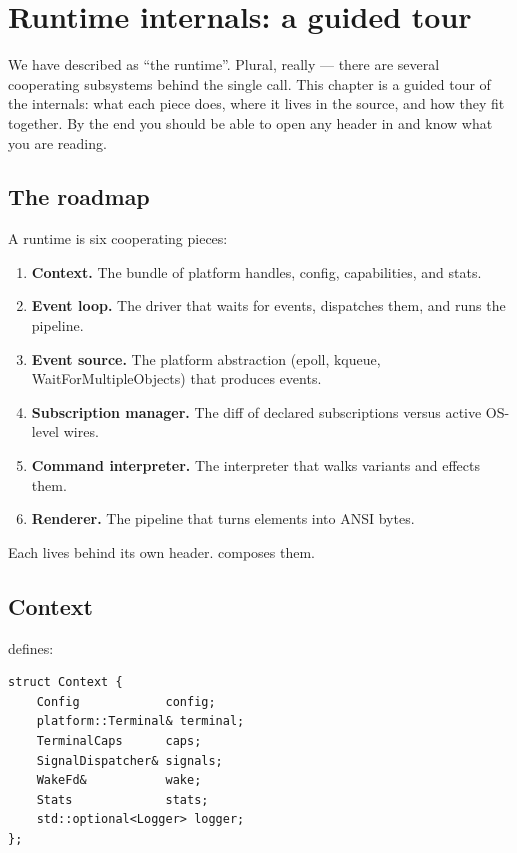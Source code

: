 \chapter{Runtime internals: a guided tour}
\label{ch:runtime}

\begin{aside}
We have described  as ``the runtime''. Plural,
really --- there are several cooperating subsystems behind the
single  call. This chapter is a guided tour of the
internals: what each piece does, where it lives in the source,
and how they fit together. By the end you should be able to
open any header in  and know what
you are reading.
\end{aside}

\section{The roadmap}

A \maya{} runtime is six cooperating pieces:

\begin{enumerate}[leftmargin=*]
  \item \textbf{Context.} The bundle of platform handles,
    config, capabilities, and stats.
  \item \textbf{Event loop.} The driver that waits for events,
    dispatches them, and runs the pipeline.
  \item \textbf{Event source.} The platform abstraction (epoll,
    kqueue, WaitForMultipleObjects) that produces events.
  \item \textbf{Subscription manager.} The diff of declared
    subscriptions versus active OS-level wires.
  \item \textbf{Command interpreter.} The interpreter that walks
     variants and effects them.
  \item \textbf{Renderer.} The pipeline that turns elements into
    ANSI bytes.
\end{enumerate}

Each lives behind its own header.  composes them.

\section{Context}

 defines:

\begin{lstlisting}
struct Context {
    Config            config;
    platform::Terminal& terminal;
    TerminalCaps      caps;
    SignalDispatcher& signals;
    WakeFd&           wake;
    Stats             stats;
    std::optional<Logger> logger;
};
\end{lstlisting}

